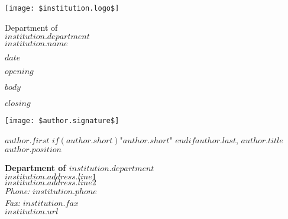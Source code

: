 \documentclass[10pt]{letter}
\begin{document}
\thispagestyle{empty}

\begin{minipage}{0.12\textwidth}
\texttt{[image: \$institution.logo\$]}
\end{minipage}
\begin{minipage}{0.88\textwidth}
\textcolor{unr_metallic}{Department of}\\
{\large {\textcolor{unr_darkblue}{$institution.department$}}}\\
\textcolor{unr_metallic}{$institution.name$}
\end{minipage} \hfill

\begin{flushright}
$date$
\end{flushright}

$opening$
\vspace{1em}

$body$
\vspace{1em}

$closing$

\texttt{[image: \$author.signature\$]}

$author.first$ $if(author.short)$"$author.short$" $endif$$author.last$, $author.title$\\
$author.position$

\vfill

\begin{flushright}
\small
\textbf{\textcolor{unr_darkblue}{Department of $institution.department$}}\\
$institution.address.line1$\\
$institution.address.line2$\\
\textit{\textcolor{unr_silver}{Phone:}} $institution.phone$\\
\textit{\textcolor{unr_silver}{Fax:}} $institution.fax$\\
$institution.url$
\end{flushright}
\end{document}
